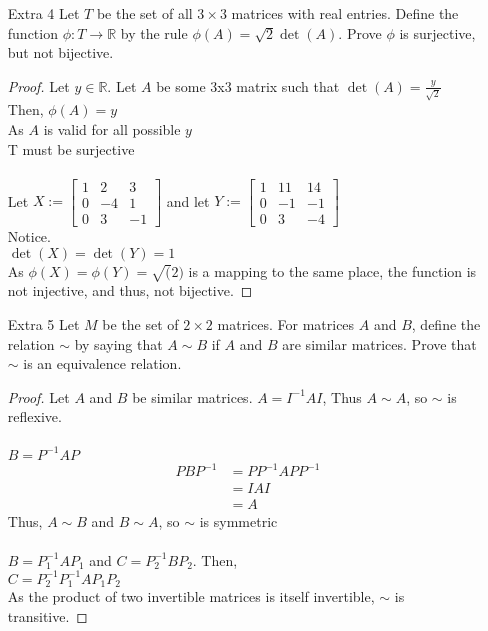 \documentclass[12pt]{article}
\newcommand{\R}{\mathbb{R}}
\begin{document}
\begin{enumerate}
	\item[Extra 4] Let $T$ be the set of all $3 \times 3$ matrices with real entries. Define the function $\phi : T \to \mathbb{R}$ by the rule $\phi(A) = \sqrt{2} \det(A)$. Prove $\phi$ is surjective, but not bijective.
	\begin{proof}
		Let $y\in \R$. Let $A$ be some 3x3 matrix such that $\det(A) = \frac{y}{\sqrt{2}}$\\
		Then, $\phi(A) = y$\\
		As $A$ is valid for all possible $y$\\
		T must be surjective\\
		\\
		Let $X:= \begin{bmatrix}
		1 & 2 & 3 \\
		0 & -4 & 1 \\
		0 & 3 & -1 
		\end{bmatrix}  $ and 
		let $Y:= \begin{bmatrix}
		1 & 11 & 14 \\
		0 & -1 & -1 \\
		0 & 3 & -4 
		\end{bmatrix}$\\
		Notice.\\
		$\det(X)=\det(Y)=1$\\
		As $\phi(X) =\phi(Y) = \sqrt(2)$ is a mapping to the same place, the function is not injective, and thus, not bijective.
	\end{proof}
	\item[Extra 5] Let $M$ be the set of $2 \times 2$ matrices. For matrices $A$ and $B$, define the relation $\sim$ by saying that $A \sim B$ if $A$ and $B$ are similar matrices. Prove that $\sim$ is an equivalence relation.
	\begin{proof}
		Let $A$ and $B$ be similar matrices.
		$A = I^{-1}AI$, Thus $A \sim A$, so $\sim$ is reflexive.\\
		\\
		$B = P^{-1}AP$
		\begin{align*}
				PBP^{-1}&=PP^{-1}APP^{-1}\\
						&=IAI\\
						&=A
		\end{align*}
		Thus, $A\sim B$ and $B\sim A$, so $\sim$ is symmetric\\
		\\
		$B=P_1^{-1}AP_1$ and $C=P_2^{-1}BP_2$. Then,\\
		$C=P_2^{-1}P_1^{-1}AP_1P_2$\\
		As the product of two invertible matrices is itself invertible, $\sim$ is transitive.

		
	\end{proof}
	
\end{enumerate}
\end{document}
